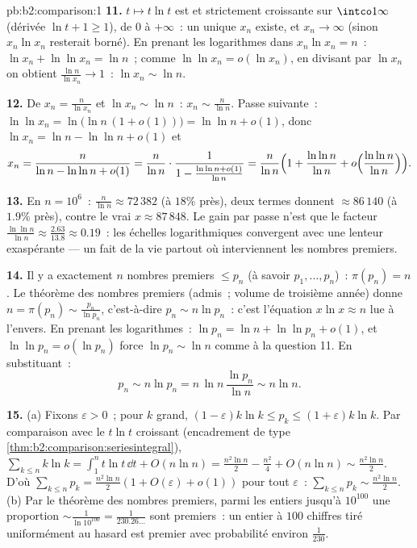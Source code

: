 \begin{solution}{pb:b2:comparison:1}
\textbf{11.} $t \mapsto t\ln t$ est  et strictement
croissante sur $\intco1\infty$ (dérivée $\ln t + 1 \geq 1$),
de $0$ à $+\infty$~: un unique $x_n$ existe, et $x_n \to
\infty$ (sinon $x_n\ln x_n$ resterait borné). En prenant les
logarithmes dans $x_n\ln x_n = n$~: $\ln x_n + \ln\ln x_n = \ln n$~;
comme $\ln\ln x_n = o(\ln x_n)$, en divisant par $\ln x_n$ on obtient
$\frac{\ln n}{\ln x_n} \to 1$~: $\ln x_n \sim \ln n$.

\textbf{12.} De $x_n = \frac{n}{\ln x_n}$ et $\ln x_n \sim
\ln n$~: $x_n \sim \frac{n}{\ln n}$. Passe suivante~: $\ln\ln x_n =
\ln\bigl(\ln n\,(1 + o(1))\bigr) = \ln\ln n + o(1)$, donc $\ln
x_n = \ln n - \ln\ln n + o(1)$ et
\[
x_n = \frac{n}{\ln n - \ln\ln n + o(1)}
= \frac{n}{\ln n}\cdot\frac{1}{1 - \frac{\ln\ln n +
o(1)}{\ln n}}
= \frac{n}{\ln n}\Bigl(1 + \frac{\ln\ln n}{\ln n} +
o\Bigl(\frac{\ln\ln n}{\ln n}\Bigr)\Bigr).
\]

\textbf{13.} En $n = 10^6$~: $\frac{n}{\ln n} \approx 72\,382$
(à $18\%$ près), deux termes donnent $\approx 86\,140$ (à
$1.9\%$ près), contre le vrai $x \approx 87\,848$. Le gain par
passe n'est que le facteur $\frac{\ln\ln n}{\ln n} \approx
\frac{2.63}{13.8} \approx 0.19$~: les échelles logarithmiques
convergent avec une lenteur exaspérante --- un fait de la vie partout
où interviennent les nombres premiers.

\textbf{14.} Il y a exactement $n$ nombres premiers $\leq p_n$ (à
savoir $p_1, \dots, p_n$)~: $\pi(p_n) = n$. Le théorème des nombres
premiers (admis~; volume de troisième année) donne $n = \pi(p_n) \sim
\frac{p_n}{\ln p_n}$, c'est-à-dire $p_n \sim n\ln p_n$~: c'est
l'équation $x\ln x \approx n$ lue à l'envers. En prenant les
logarithmes~: $\ln p_n = \ln n + \ln\ln p_n + o(1)$, et $\ln\ln p_n =
o(\ln p_n)$ force $\ln p_n \sim \ln n$ comme à la question 11.
En substituant~:
\[
p_n \sim n\ln p_n = n\,\ln n\,\frac{\ln p_n}{\ln n} \sim n\ln
n .
\]

\textbf{15.} (a) Fixons $\varepsilon > 0$~; pour $k$ grand, $(1 -
\varepsilon)k\ln k \leq p_k \leq (1 + \varepsilon)k\ln k$. Par
comparaison avec le $t\ln t$ croissant
(encadrement de type \cref{thm:b2:comparison:seriesintegral}),
$\sum_{k\leq n}k\ln k = \int_1^n t\ln t\,\dd t + O(n\ln n) =
\frac{n^2\ln n}2 - \frac{n^2}4 + O(n\ln n) \sim
\frac{n^2\ln n}2$. D'où $\sum_{k\leq n}p_k = \frac{n^2\ln
n}{2}(1 + O(\varepsilon) + o(1))$ pour tout $\varepsilon$~:
$\sum_{k\leq n}p_k \sim \frac{n^2\ln n}2$. (b) Par le théorème des
nombres premiers, parmi les entiers jusqu'à $10^{100}$ une
proportion $\sim \frac{1}{\ln 10^{100}} = \frac1{230.26\dots}$
sont premiers~: un entier à $100$ chiffres tiré uniformément au hasard
est premier avec probabilité environ $\frac1{230}$.


\end{solution}
